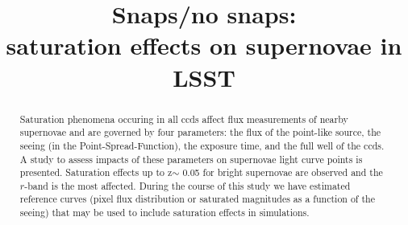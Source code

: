 \documentclass[\docopts]{\docclass}
\begin{document}
\title{Snaps/no snaps: \\ saturation effects on supernovae in LSST}

\maketitlepre

\begin{abstract}

  Saturation phenomena occuring in all ccds affect flux measurements of nearby supernovae and are governed by four parameters: the flux of the point-like source, the seeing (in the Point-Spread-Function), the exposure time, and the full well of the ccds. A study to assess impacts of these parameters on supernovae light curve points is presented. Saturation effects up to z$\sim$ 0.05 for bright supernovae are observed and the $r$-band is the most affected. During the course of this study we have estimated reference curves (pixel flux distribution or saturated magnitudes as a function of the seeing) that may be used to include saturation effects in simulations. 

\end{abstract}

\dockeys{}

\maketitlepost

\end{document}
